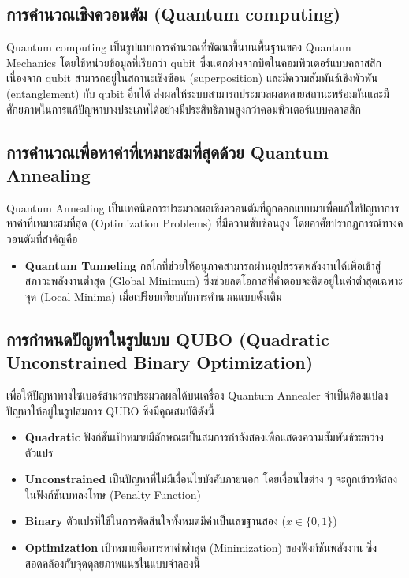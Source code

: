 \subsection{การคำนวณเชิงควอนตัม (Quantum computing)}
Quantum computing เป็นรูปแบบการคำนวณที่พัฒนาขึ้นบนพื้นฐานของ Quantum Mechanics \cite{qtbook} โดยใช้หน่วยข้อมูลที่เรียกว่า qubit ซึ่งแตกต่างจากบิตในคอมพิวเตอร์แบบคลาสสิก เนื่องจาก qubit สามารถอยู่ในสถานะเชิงซ้อน (superposition) และมีความสัมพันธ์เชิงพัวพัน (entanglement) กับ qubit อื่นได้ ส่งผลให้ระบบสามารถประมวลผลหลายสถานะพร้อมกันและมีศักยภาพในการแก้ปัญหาบางประเภทได้อย่างมีประสิทธิภาพสูงกว่าคอมพิวเตอร์แบบคลาสสิก

\subsection{การคำนวณเพื่อหาค่าที่เหมาะสมที่สุดด้วย Quantum Annealing}
Quantum Annealing เป็นเทคนิคการประมวลผลเชิงควอนตัมที่ถูกออกแบบมาเพื่อแก้ไขปัญหาการหาค่าที่เหมาะสมที่สุด (Optimization Problems) ที่มีความซับซ้อนสูง \cite{annealing} โดยอาศัยปรากฏการณ์ทางควอนตัมที่สำคัญคือ
\begin{itemize}
    \item \textbf{Quantum Tunneling} กลไกที่ช่วยให้อนุภาคสามารถผ่านอุปสรรคพลังงานได้เพื่อเข้าสู่สภาวะพลังงานต่ำสุด (Global Minimum) ซึ่งช่วยลดโอกาสที่คำตอบจะติดอยู่ในค่าต่ำสุดเฉพาะจุด (Local Minima) เมื่อเปรียบเทียบกับการคำนวณแบบดั้งเดิม
\end{itemize}

\subsection{การกำหนดปัญหาในรูปแบบ QUBO (Quadratic Unconstrained Binary Optimization)}
เพื่อให้ปัญหาทางไซเบอร์สามารถประมวลผลได้บนเครื่อง Quantum Annealer จำเป็นต้องแปลงปัญหาให้อยู่ในรูปสมการ QUBO \cite{qubo,npproblems} ซึ่งมีคุณสมบัติดังนี้
\begin{itemize}
    \item \textbf{Quadratic} ฟังก์ชันเป้าหมายมีลักษณะเป็นสมการกำลังสองเพื่อแสดงความสัมพันธ์ระหว่างตัวแปร
    \item \textbf{Unconstrained} เป็นปัญหาที่ไม่มีเงื่อนไขบังคับภายนอก โดยเงื่อนไขต่าง ๆ จะถูกเข้ารหัสลงในฟังก์ชันบทลงโทษ (Penalty Function)
    \item \textbf{Binary} ตัวแปรที่ใช้ในการตัดสินใจทั้งหมดมีค่าเป็นเลขฐานสอง ($x \in \{0, 1\}$)
    \item \textbf{Optimization} เป้าหมายคือการหาค่าต่ำสุด (Minimization) ของฟังก์ชันพลังงาน ซึ่งสอดคล้องกับจุดดุลยภาพแนชในแบบจำลองนี้
\end{itemize}


